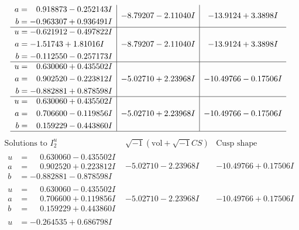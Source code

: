 \documentclass[1p]{elsarticle_modified}
\theoremstyle{definition}
\newcommand{\I}{\sqrt{-1}}
\begin{document}
$$\begin{array}{c|c|c}
\begin{aligned}
a &= \phantom{-}0.918873 - 0.252143 I \\
b &= -0.963307 + 0.936491 I\end{aligned}
 & -8.79207 - 2.11040 I & -13.9124 + 3.3898 I \\ \hline\begin{aligned}
u &= -0.621912 - 0.497822 I \\
a &= -1.51743 + 1.81016 I \\
b &= -0.112550 - 0.257173 I\end{aligned}
 & -8.79207 - 2.11040 I & -13.9124 + 3.3898 I \\ \hline\begin{aligned}
u &= \phantom{-}0.630060 + 0.435502 I \\
a &= \phantom{-}0.902520 - 0.223812 I \\
b &= -0.882881 + 0.878598 I\end{aligned}
 & -5.02710 + 2.23968 I & -10.49766 - 0.17506 I \\ \hline\begin{aligned}
u &= \phantom{-}0.630060 + 0.435502 I \\
a &= \phantom{-}0.706600 - 0.119856 I \\
b &= \phantom{-}0.159229 - 0.443860 I\end{aligned}
 & -5.02710 + 2.23968 I & -10.49766 - 0.17506 I\\
 \hline 
 \end{array}$$\newpage$$\begin{array}{c|c|c}  
\text{Solutions to }I^u_{2}& \I (\text{vol} + \sqrt{-1}CS) & \text{Cusp shape}\\
 \hline 
\begin{aligned}
u &= \phantom{-}0.630060 - 0.435502 I \\
a &= \phantom{-}0.902520 + 0.223812 I \\
b &= -0.882881 - 0.878598 I\end{aligned}
 & -5.02710 - 2.23968 I & -10.49766 + 0.17506 I \\ \hline\begin{aligned}
u &= \phantom{-}0.630060 - 0.435502 I \\
a &= \phantom{-}0.706600 + 0.119856 I \\
b &= \phantom{-}0.159229 + 0.443860 I\end{aligned}
 & -5.02710 - 2.23968 I & -10.49766 + 0.17506 I \\ \hline\begin{aligned}
u &= -0.264535 + 0.686798 I \\

\end{aligned}
\end{array}$$
\end{document}
